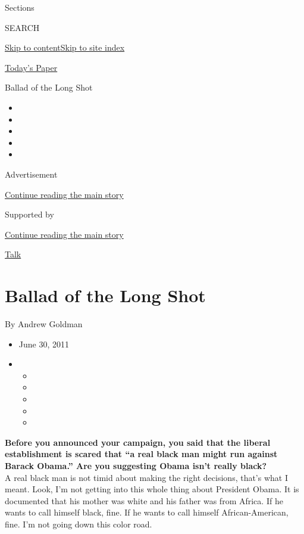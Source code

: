 Sections

SEARCH

\protect\hyperlink{site-content}{Skip to
content}\protect\hyperlink{site-index}{Skip to site index}

\href{https://myaccount.nytimes.com/auth/login?response_type=cookie\&client_id=vi}{}

\href{https://www.nytimes.com/section/todayspaper}{Today's Paper}

Ballad of the Long Shot

\begin{itemize}
\item
\item
\item
\item
\item
\end{itemize}

Advertisement

\protect\hyperlink{after-top}{Continue reading the main story}

Supported by

\protect\hyperlink{after-sponsor}{Continue reading the main story}

\href{/column/magazine-talk}{Talk}

\hypertarget{ballad-of-the-long-shot}{%
\section{Ballad of the Long Shot}\label{ballad-of-the-long-shot}}

By Andrew Goldman

\begin{itemize}
\item
  June 30, 2011
\item
  \begin{itemize}
  \item
  \item
  \item
  \item
  \item
  \end{itemize}
\end{itemize}

\textbf{Before you announced your campaign, you said that the liberal
establishment is scared that ``a real black man might run against Barack
Obama.'' Are you suggesting Obama isn't really black?}\\
A real black man is not timid about making the right decisions, that's
what I meant. Look, I'm not getting into this whole thing about
President Obama. It is documented that his mother was white and his
father was from Africa. If he wants to call himself black, fine. If he
wants to call himself African-American, fine. I'm not going down this
color road.

